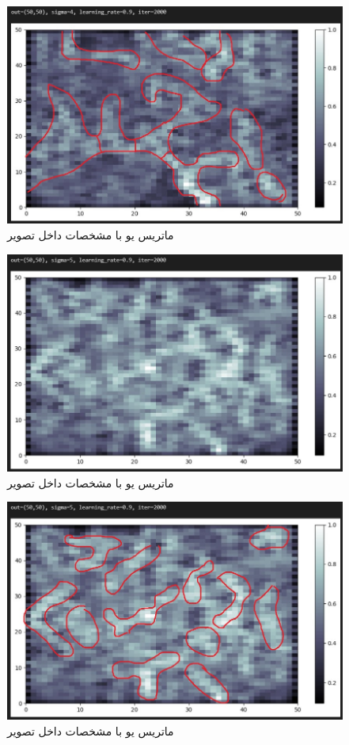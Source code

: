 \documentclass{article}
\begin{document}
\begin{figure}[!h]
    \centering\includegraphics[scale=.65]{./p3-8}
    \caption{ماتریس یو با مشخصات داخل تصویر}\label{fig.38}
\end{figure}


\cleardoublepage


\begin{figure}[!h]
    \centering\includegraphics[scale=.65]{./p3-9}
    \caption{ماتریس یو با مشخصات داخل تصویر}\label{fig.39}
\end{figure}

\begin{figure}[!h]
    \centering\includegraphics[scale=.65]{./p3-10}
    \caption{ماتریس یو با مشخصات داخل تصویر}\label{fig.310}
\end{figure}
\end{document}
